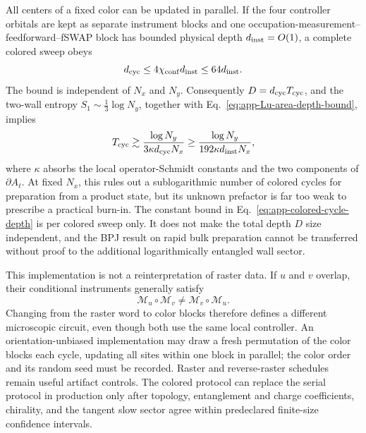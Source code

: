 All centers of a fixed color can be updated in parallel.  If the four
controller orbitals are kept as separate instrument blocks and one
occupation-measurement--feedforward--fSWAP block has bounded physical depth
\(d_{\rm inst}=O(1)\), a complete colored sweep obeys
\begin{equation}
    d_{\rm cyc}
    \le4\chi_{\rm conf}d_{\rm inst}
    \le64d_{\rm inst}.
    \label{eq:app-colored-cycle-depth}
\end{equation}
The bound is independent of \(N_x\) and \(N_y\).  Consequently
\(D=d_{\rm cyc}T_{\rm cyc}\), and the two-wall entropy
\(S_1\sim\frac13\log N_y\), together with
Eq.~\eqref{eq:app-Lu-area-depth-bound}, implies
\begin{equation}
    T_{\rm cyc}
    \gtrsim
    \frac{\log N_y}{3\kappa d_{\rm cyc}N_x}
    \ge
    \frac{\log N_y}{192\kappa d_{\rm inst}N_x},
    \label{eq:app-colored-cycle-Lu-bound}
\end{equation}
where \(\kappa\) absorbs the local operator-Schmidt constants and the two
components of \(\partial A_\ell\).  At fixed \(N_x\), this rules out a
sublogarithmic number of colored cycles for preparation from a product state,
but its unknown prefactor is far too weak to prescribe a practical burn-in.
The constant bound in Eq.~\eqref{eq:app-colored-cycle-depth} is per colored
sweep only.  It does not make the total depth \(D\) size independent, and the
BPJ result on rapid bulk preparation cannot be transferred without proof to
the additional logarithmically entangled wall sector.

This implementation is not a reinterpretation of raster data.  If \(u\) and
\(v\) overlap, their conditional instruments generally satisfy
\begin{equation}
    \mathcal M_u\circ\mathcal M_v
    \ne
    \mathcal M_v\circ\mathcal M_u.
    \label{eq:app-instrument-noncommutativity}
\end{equation}
Changing from the raster word to color blocks therefore defines a different
microscopic circuit, even though both use the same local controller.  An
orientation-unbiased implementation may draw a fresh permutation of the
color blocks each cycle, updating all sites within one block in parallel;
the color order and its random seed must be recorded.  Raster and
reverse-raster schedules remain useful artifact controls.  The colored
protocol can replace the serial protocol in production only after topology,
entanglement and charge coefficients, chirality, and the tangent slow sector
agree within predeclared finite-size confidence intervals.

